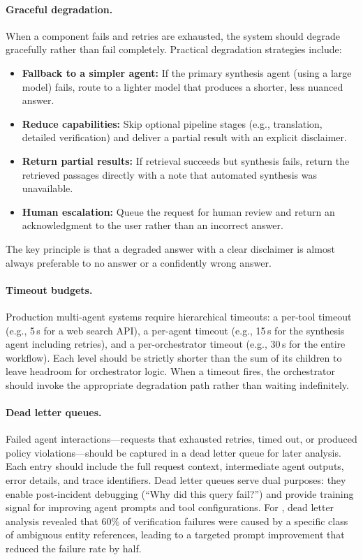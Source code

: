 \paragraph{Graceful degradation.}
When a component fails and retries are exhausted, the system should degrade gracefully rather than fail completely. Practical degradation strategies include:
\begin{itemize}[leftmargin=1.5em, itemsep=2pt]
  \item \textbf{Fallback to a simpler agent:} If the primary synthesis agent (using a large model) fails, route to a lighter model that produces a shorter, less nuanced answer.
  \item \textbf{Reduce capabilities:} Skip optional pipeline stages (e.g., translation, detailed verification) and deliver a partial result with an explicit disclaimer.
  \item \textbf{Return partial results:} If retrieval succeeds but synthesis fails, return the retrieved passages directly with a note that automated synthesis was unavailable.
  \item \textbf{Human escalation:} Queue the request for human review and return an acknowledgment to the user rather than an incorrect answer.
\end{itemize}
The key principle is that a degraded answer with a clear disclaimer is almost always preferable to no answer or a confidently wrong answer.

\paragraph{Timeout budgets.}
Production multi-agent systems require hierarchical timeouts: a per-tool timeout (e.g., 5\,s for a web search API), a per-agent timeout (e.g., 15\,s for the synthesis agent including retries), and a per-orchestrator timeout (e.g., 30\,s for the entire workflow). Each level should be strictly shorter than the sum of its children to leave headroom for orchestrator logic. When a timeout fires, the orchestrator should invoke the appropriate degradation path rather than waiting indefinitely.

\paragraph{Dead letter queues.}
Failed agent interactions---requests that exhausted retries, timed out, or produced policy violations---should be captured in a dead letter queue for later analysis. Each entry should include the full request context, intermediate agent outputs, error details, and trace identifiers. Dead letter queues serve dual purposes: they enable post-incident debugging (``Why did this query fail?'') and provide training signal for improving agent prompts and tool configurations. For \ishtar{}, dead letter analysis revealed that 60\% of verification failures were caused by a specific class of ambiguous entity references, leading to a targeted prompt improvement that reduced the failure rate by half.

